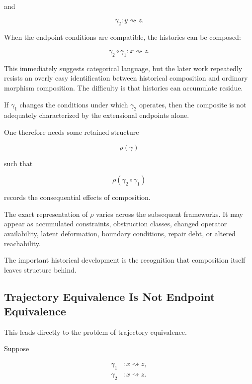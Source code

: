 \documentclass[11pt]{article}
\theoremstyle{remark}
\begin{document}
and

\begin{equation}
\gamma_2:y\rightsquigarrow z.
\end{equation}

When the endpoint conditions are compatible, the histories can be composed:

\begin{equation}
\gamma_2\circ\gamma_1
:
x\rightsquigarrow z.
\end{equation}

This immediately suggests categorical language, but the later work repeatedly resists an overly easy identification between historical composition and ordinary morphism composition. The difficulty is that histories can accumulate residue.

If $\gamma_1$ changes the conditions under which $\gamma_2$ operates, then the composite is not adequately characterized by the extensional endpoints alone.

One therefore needs some retained structure

\begin{equation}
\rho(\gamma)
\end{equation}

such that

\begin{equation}
\rho(\gamma_2\circ\gamma_1)
\end{equation}

records the consequential effects of composition.

The exact representation of $\rho$ varies across the subsequent frameworks. It may appear as accumulated constraints, obstruction classes, changed operator availability, latent deformation, boundary conditions, repair debt, or altered reachability.

The important historical development is the recognition that composition itself leaves structure behind.

\subsection{Trajectory Equivalence Is Not Endpoint Equivalence}

This leads directly to the problem of trajectory equivalence.

Suppose

\begin{align}
\gamma_1 &: x\rightsquigarrow z,\\
\gamma_2 &: x\rightsquigarrow z.
\end{align}
\end{document}
